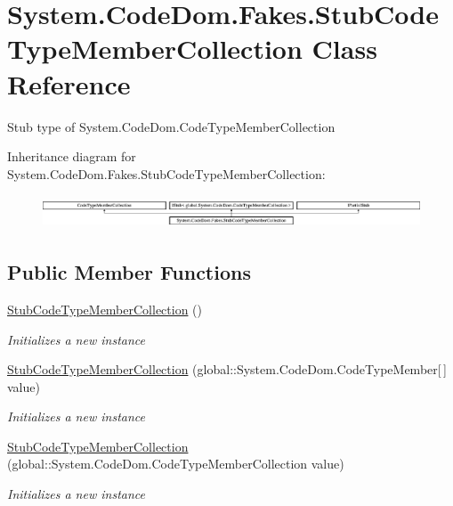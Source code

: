 \hypertarget{class_system_1_1_code_dom_1_1_fakes_1_1_stub_code_type_member_collection}{\section{System.\-Code\-Dom.\-Fakes.\-Stub\-Code\-Type\-Member\-Collection Class Reference}
\label{class_system_1_1_code_dom_1_1_fakes_1_1_stub_code_type_member_collection}
}


Stub type of System.\-Code\-Dom.\-Code\-Type\-Member\-Collection 


Inheritance diagram for System.\-Code\-Dom.\-Fakes.\-Stub\-Code\-Type\-Member\-Collection\-:\begin{figure}[H]
\begin{center}
\leavevmode
\includegraphics[height=1.000894cm]{class_system_1_1_code_dom_1_1_fakes_1_1_stub_code_type_member_collection}
\end{center}
\end{figure}
\subsection*{Public Member Functions}
\begin{DoxyCompactItemize}
\item 
\hyperlink{class_system_1_1_code_dom_1_1_fakes_1_1_stub_code_type_member_collection_a80490ce49031d9f924bcaefc907aa669}{Stub\-Code\-Type\-Member\-Collection} ()
\begin{DoxyCompactList}\small\item\em Initializes a new instance\end{DoxyCompactList}\item 
\hyperlink{class_system_1_1_code_dom_1_1_fakes_1_1_stub_code_type_member_collection_a02fa62c908c08bb6ede39790e2aaec59}{Stub\-Code\-Type\-Member\-Collection} (global\-::\-System.\-Code\-Dom.\-Code\-Type\-Member\mbox{[}$\,$\mbox{]} value)
\begin{DoxyCompactList}\small\item\em Initializes a new instance\end{DoxyCompactList}\item 
\hyperlink{class_system_1_1_code_dom_1_1_fakes_1_1_stub_code_type_member_collection_aa54b0be4ae8a349b141023d51cca2c45}{Stub\-Code\-Type\-Member\-Collection} (global\-::\-System.\-Code\-Dom.\-Code\-Type\-Member\-Collection value)
\begin{DoxyCompactList}\small\item\em Initializes a new instance\end{DoxyCompactList}\end{DoxyCompactItemize}
